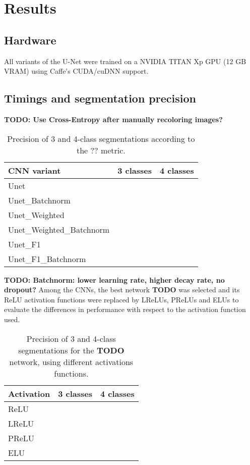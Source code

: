 \chapter {Results}
\label{chap:results}

	\section{Hardware}
All variants of the U-Net were trained on a NVIDIA TITAN Xp GPU (12 GB VRAM) using Caffe's CUDA/cuDNN support.

	\section {Timings and segmentation precision}
\textbf{TODO: Use Cross-Entropy after manually recoloring images?}

\begin {table}
	\centering
	\begin {tabular}[!ht]{|l|c|c|}
		\hline
		\textbf{CNN variant}& \textbf{3 classes}& \textbf{4 classes}\\ \hline
		Unet& & \\ \hline
		Unet\_Batchnorm& & \\ \hline
		Unet\_Weighted& & \\ \hline
		Unet\_Weighted\_Batchnorm& & \\ \hline
		Unet\_F1& & \\ \hline
		Unet\_F1\_Batchnorm & & \\ \hline
	\end {tabular}
\caption[]{Precision of 3 and 4-class segmentations according to the ?? metric.}
\end {table}

\textbf{TODO: Batchnorm: lower learning rate, higher decay rate, no dropout?}
\noindent Among the CNNs, the best network \textbf{TODO} was selected and its ReLU activation functions were replaced by LReLUs, PReLUs and ELUs to evaluate the differences in performance with respect to the activation function used.

\begin {table}
	\centering
	\begin {tabular}[!ht]{|l|c|c|}
		\hline
		\textbf{Activation}& \textbf{3 classes}& \textbf{4 classes}\\ \hline
		ReLU& & \\ \hline
		LReLU& & \\ \hline
		PReLU& & \\ \hline
		ELU& & \\ \hline
	\end {tabular}
\caption[]{Precision of 3 and 4-class segmentations for the \textbf{TODO} network, using different activations functions.}
\end {table}

